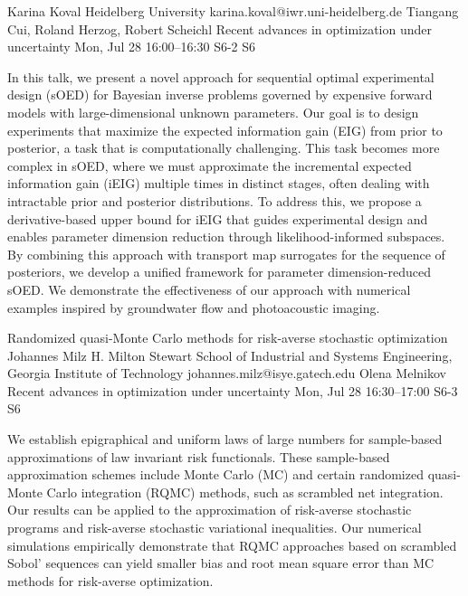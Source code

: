 \begin{talk}
  {Karina Koval}%
  {Heidelberg University}%
  {karina.koval@iwr.uni-heidelberg.de}%
  {Tiangang Cui, Roland Herzog, Robert Scheichl}%
  {Recent advances in optimization under uncertainty}%
  {}%
  {Mon, Jul 28 16:00–16:30}%
  {S6-2}%
  {S6}%
				
			
In this talk, we present a novel approach for sequential optimal experimental design (sOED) for Bayesian inverse problems governed by expensive forward models with large-dimensional unknown parameters. Our goal is to design experiments that maximize the expected information gain (EIG) from prior to posterior, a task that is computationally challenging. This task becomes more complex in sOED, where we must approximate the incremental expected information gain (iEIG) multiple times in distinct stages, often dealing with intractable prior and posterior distributions. To address this, we propose a derivative-based upper bound for iEIG that guides experimental design and enables parameter dimension reduction through likelihood-informed subspaces. By combining this approach with transport map surrogates for the sequence of posteriors, we develop a unified framework for parameter dimension-reduced sOED. We demonstrate the effectiveness of our approach with numerical examples inspired by groundwater flow and photoacoustic imaging.
\end{talk}

\begin{talk}
  {Randomized quasi-Monte Carlo methods for risk-averse stochastic optimization}%
  {Johannes Milz}%
  {H. Milton Stewart School of Industrial and Systems Engineering, Georgia Institute of Technology}%
  {johannes.milz@isye.gatech.edu}%
  {Olena Melnikov}%
  {Recent advances in optimization under uncertainty}%
  {Mon, Jul 28 16:30–17:00}%
  {S6-3}%
  {S6}%
				

We establish epigraphical and uniform laws of large numbers for sample-based approximations of law invariant risk functionals. These sample-based approximation schemes include Monte Carlo (MC) and certain randomized quasi-Monte Carlo integration (RQMC) methods, such as scrambled net integration. Our results can be applied to the approximation of risk-averse stochastic programs and risk-averse stochastic variational inequalities. Our numerical simulations empirically demonstrate that RQMC approaches based on scrambled Sobol' sequences can yield smaller bias and root mean square error than MC methods for risk-averse optimization.




\end{talk}

